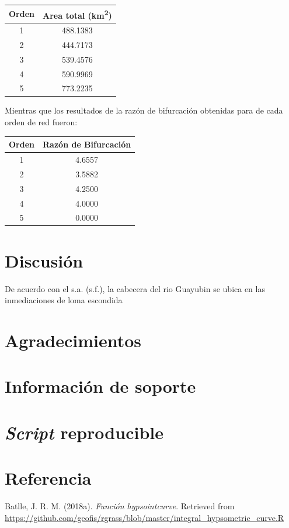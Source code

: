 \documentclass[11pt,]{article}
\begin{document}
\begin{longtable}[]{@{}cc@{}}
\toprule
Orden & Area total (km\textsuperscript{2})\tabularnewline
\midrule
\endhead
1 & 488.1383\tabularnewline
2 & 444.7173\tabularnewline
3 & 539.4576\tabularnewline
4 & 590.9969\tabularnewline
5 & 773.2235\tabularnewline
\bottomrule
\end{longtable}

Mientras que los resultados de la razón de bifurcación obtenidas para de
cada orden de red fueron:

\begin{longtable}[]{@{}cc@{}}
\toprule
Orden & Razón de Bifurcación\tabularnewline
\midrule
\endhead
1 & 4.6557\tabularnewline
2 & 3.5882\tabularnewline
3 & 4.2500\tabularnewline
4 & 4.0000\tabularnewline
5 & 0.0000\tabularnewline
\bottomrule
\end{longtable}

\section{Discusión}\label{discusiuxf3n}

De acuerdo con el s.a. (s.f.), la cabecera del rio Guayubin se ubica en
las inmediaciones de loma escondida

\section{Agradecimientos}\label{agradecimientos}

\section{Información de soporte}\label{informaciuxf3n-de-soporte}

\section{\texorpdfstring{\emph{Script}
reproducible}{Script reproducible}}\label{script-reproducible}

\section*{Referencia}\label{referencia}

\hypertarget{refs}{}
\hypertarget{ref-Hypsocjose}{}
Batlle, J. R. M. (2018a). \emph{Función hypsointcurve}. Retrieved from
\url{https://github.com/geofis/rgrass/blob/master/integral_hypsometric_curve.R}
\end{document}
